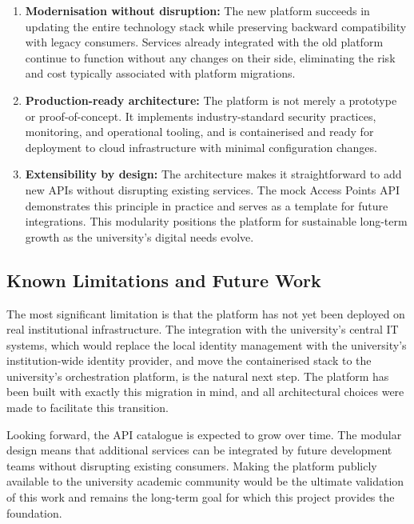 \documentclass[12pt, a4paper]{report}
\begin{document}
\begin{enumerate}
    \item \textbf{Modernisation without disruption:} The new platform succeeds in updating
          the entire technology stack while preserving backward compatibility with legacy
          consumers. Services already integrated with the old platform continue to function
          without any changes on their side, eliminating the risk and cost typically
          associated with platform migrations.
    
    \item \textbf{Production-ready architecture:} The platform is not merely a prototype
          or proof-of-concept. It implements industry-standard security practices, monitoring,
          and operational tooling, and is containerised and ready for deployment to cloud
          infrastructure with minimal configuration changes.
    
    \item \textbf{Extensibility by design:} The architecture makes it straightforward to
          add new APIs without disrupting existing services. The mock Access Points API
          demonstrates this principle in practice and serves as a template for future
          integrations. This modularity positions the platform for sustainable long-term
          growth as the university's digital needs evolve.
\end{enumerate}

\subsection{Known Limitations and Future Work}

The most significant limitation is that the platform has not yet been deployed on real
institutional infrastructure. The integration with the university's central IT systems,
which would replace the local identity management with the university's institution-wide
identity provider, and move the containerised stack to the university's orchestration
platform, is the natural next step. The platform has been built with exactly this
migration in mind, and all architectural choices were made to facilitate this transition.

Looking forward, the API catalogue is expected to grow over time. The modular design means
that additional services can be integrated by future development teams without disrupting
existing consumers. Making the platform publicly available to the university academic
community would be the ultimate validation of this work and remains the long-term goal
for which this project provides the foundation.
\end{document}
